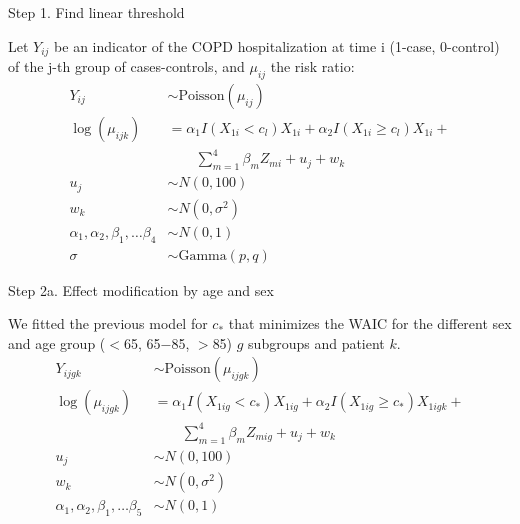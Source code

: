 \documentclass{beamer}
\begin{document}
\begin{frame}{Step 1. Find linear threshold}
	
	Let $Y_{ij}$ be  an indicator of the COPD hospitalization at time i (1-case, 0-control) of the j-th group of cases-controls, and $\mu_{ij}$ the risk ratio: \vspace{-0.5cm}
	\begin{align*}
	Y_{ij}  &\sim \text{Poisson}(\mu_{ij}) \nonumber\\
	\log(\mu_{ijk})  & = \alpha_1 I(X_{1i}< c_l) X_{1i} + \alpha_2 I(X_{1i}\geq c_l)X_{1i} + \\ &  \quad\quad \sum_{m=1}^4\beta_mZ_{mi} + u_{j} + w_k \nonumber\\
	u_j & \sim N(0, 100)\nonumber\\
	w_k & \sim N(0, \sigma^2)\nonumber\\
	\alpha_1, \alpha_2, \beta_1, \dots \beta_4 & \sim N(0, 1)\nonumber\\
	\sigma & \sim \text{Gamma}(p, q) \nonumber
	\end{align*} 
\end{frame}

\begin{frame}{Step 2a. Effect modification by age and sex}
	
	We fitted the previous model for $c_*$ that minimizes the WAIC for the different sex and age group ($<$65, 65$-$85, $>$85) $g$ subgroups and patient $k$.
	\begin{align*}
	Y_{ijgk} & \sim \text{Poisson}(\mu_{ijgk}) \nonumber\\
	\log(\mu_{ijgk}) & = \alpha_1 I(X_{1ig}< c_*) X_{1ig} + \alpha_2 I(X_{1ig}\geq c_*)X_{1igk} + \\ &  \quad\quad \sum_{m=1}^4\beta_mZ_{mig} + u_{j} + w_k\nonumber\\
	u_j &\sim N(0, 100)\nonumber\\
	w_k & \sim N(0, \sigma^2)\nonumber\\
	\alpha_1, \alpha_2, \beta_1, \dots \beta_5 &\sim N(0, 1)\nonumber\\
	\end{align*} 
	
\end{frame}
\end{document}
